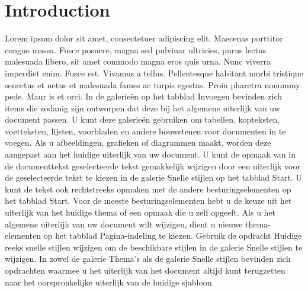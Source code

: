 \section{Introduction}
Lorem ipsum dolor sit amet, consectetuer adipiscing elit. Maecenas porttitor congue massa. Fusce posuere, magna sed pulvinar ultricies, purus lectus malesuada libero, sit amet commodo magna eros quis urna.
Nunc viverra imperdiet enim. Fusce est. Vivamus a tellus.
Pellentesque habitant morbi tristique senectus et netus et malesuada fames ac turpis egestas. Proin pharetra nonummy pede. Maur
is et orci.
In de galerieën op het tabblad Invoegen bevinden zich items die zodanig zijn ontworpen dat deze bij het algemene uiterlijk van uw document passen. U kunt deze galerieën gebruiken om tabellen, kopteksten, voetteksten, lijsten, voorbladen en andere bouwstenen voor documenten in te voegen. Als u afbeeldingen, grafieken of diagrammen maakt, worden deze aangepast aan het huidige uiterlijk van uw document.
U kunt de opmaak van in de documenttekst geselecteerde tekst gemakkelijk wijzigen door een uiterlijk voor de geselecteerde tekst te kiezen in de galerie Snelle stijlen op het tabblad Start. U kunt de tekst ook rechtstreeks opmaken met de andere besturingselementen op het tabblad Start. Voor de meeste besturingselementen hebt u de keuze uit het uiterlijk van het huidige thema of een opmaak die u zelf opgeeft.
Als u het algemene uiterlijk van uw document wilt wijzigen, dient u nieuwe thema-elementen op het tabblad Pagina-indeling te kiezen. Gebruik de opdracht Huidige reeks snelle stijlen wijzigen om de beschikbare stijlen in de galerie Snelle stijlen te wijzigen. In zowel de galerie Thema's als de galerie Snelle stijlen bevinden zich opdrachten waarmee u het uiterlijk van het document altijd kunt terugzetten naar het oorspronkelijke uiterlijk van de huidige sjabloon.